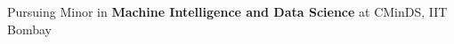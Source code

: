 


\vspace*{50mm}

\noindent Pursuing Minor in \textbf{Machine Intelligence and Data Science} at CMinDS, IIT Bombay

\vspace{-14pt}







\newpage


\vspace{-15pt}


\vspace{-10pt}





